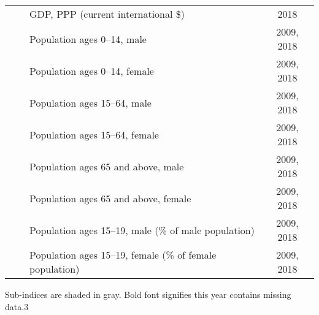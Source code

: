 {\begin{tabular}{cclc}
          &       & GDP, PPP (current international \$) & 2018 \\
          &       & Population ages 0--14, male & 2009, 2018 \\
          &       & Population ages 0--14, female & 2009, 2018 \\
          &       & Population ages 15--64, male & 2009, 2018 \\
          &       & Population ages 15--64, female & 2009, 2018 \\
          &       & Population ages 65 and above, male & 2009, 2018 \\
          &       & Population ages 65 and above, female & 2009, 2018 \\
          &       & Population ages 15--19, male (\% of male population) & 2009, 2018 \\
          &       & Population ages 15--19, female (\% of female population) & 2009, 2018 \\
          \bottomrule
    \end{tabular}
}{Sub-indices are shaded in gray. Bold font signifies this year contains missing data.}{3}
\newpage

